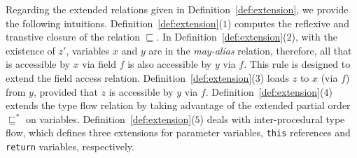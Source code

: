 \documentclass{fac}
\newcommand\ie{\textit{i.e.\ }}
\newcommand{\less}{\sqsubseteq}
\newcommand{\tflow}{\dashrightarrow}
\begin{document}
Regarding the extended relations given in Definition~\ref{def:extension}, we provide the following intuitions. Definition~\ref{def:extension}($1$)  computes the reflexive and transtive closure of the relation $\less$.
In Definition~\ref{def:extension}($2$), with the existence of $z'$, variables $x$ and $y$ are in the \emph{may-alias} relation, therefore, all that is accessible by $x$ via field $f$ is also accessible by $y$ via $f$. This rule is designed to extend the field access relation.
Definition~\ref{def:extension}($3$) loads $z$ to $x$ (via $f$) from $y$, provided that $z$ is accessible by $y$ via $f$.
Definition~\ref{def:extension}($4$) extends the type flow relation by taking advantage of the extended partial order $\less^*$ on variables.
Definition~\ref{def:extension}($5$) deals with inter-procedural type flow, which defines three extensions for parameter variables, \texttt{this} references and \texttt{return} variables, respectively.

\end{document}
